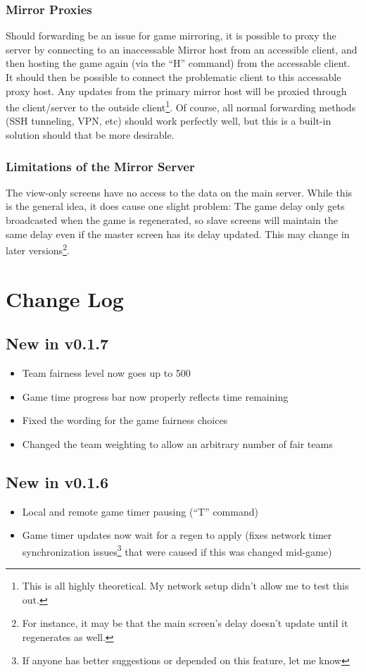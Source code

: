\documentclass[pdftex,10pt,a4paper]{report}
\begin{document}
\subsection{Mirror Proxies}
Should forwarding be an issue for game mirroring, it is possible to proxy the server by connecting to an inaccessable Mirror host from an accessible client, and then hosting the game again (via the ``H'' command) from the accessable client.  It should then be possible to connect the problematic client to this accessable proxy host.  Any updates from the primary mirror host will be proxied through the client/server to the outside client\footnote{This is all highly theoretical.  My network setup didn't allow me to test this out.}.  Of course, all normal forwarding methods (SSH tunneling, VPN, etc) should work perfectly well, but this is a built-in solution should that be more desirable.

\subsection{Limitations of the Mirror Server}
The view-only screens have no access to the data on the main server.  While this is the general idea, it does cause one slight problem:  The game delay only gets broadcasted when the game is regenerated, so slave screens will maintain the same delay even if the master screen has its delay updated.  This may change in later versions\footnote{For instance, it may be that the main screen's delay doesn't update until it regenerates as well.}.

\chapter{Change Log}
\section{New in v0.1.7}
\begin{itemize}
\item Team fairness level now goes up to 500
\item Game time progress bar now properly reflects time remaining
\item Fixed the wording for the game fairness choices
\item Changed the team weighting to allow an arbitrary number of fair teams
\end{itemize}
\section{New in v0.1.6}
\begin{itemize}
\item Local and remote game timer pausing (``T'' command)
\item Game timer updates now wait for a regen to apply (fixes network timer synchronization issues\footnote{If anyone has better suggestions or depended on this feature, let me know} that were caused if this was changed mid-game)
\end{itemize}
\end{document}
